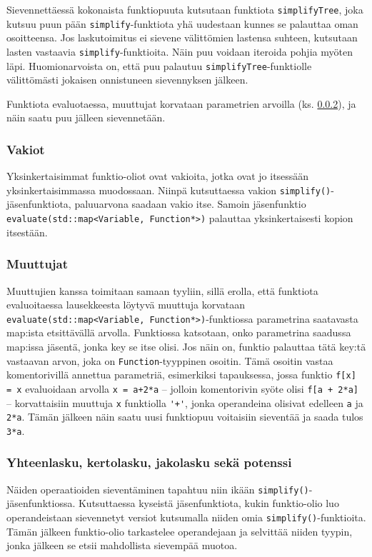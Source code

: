 \documentclass[10pt,a4paper]{article}
\begin{document}
Sievennettäessä kokonaista funktiopuuta kutsutaan funktiota \lstinline!simplifyTree!, joka kutsuu puun pään \lstinline!simplify!-funktiota yhä uudestaan kunnes se palauttaa oman osoitteensa. Jos laskutoimitus ei sievene välittömien lastensa suhteen, kutsutaan lasten vastaavia \lstinline!simplify!-funktioita. Näin puu voidaan iteroida pohjia myöten läpi. Huomionarvoista on, että puu palautuu \lstinline!simplifyTree!-funktiolle välittömästi jokaisen onnistuneen sievennyksen jälkeen.

Funktiota evaluotaessa, muuttujat
korvataan parametrien arvoilla (ks. \ref{sec:muuttujat}), ja näin saatu puu jälleen sievennetään.

\subsubsection{Vakiot}
Yksinkertaisimmat funktio-oliot ovat vakioita, jotka ovat jo itsessään yksinkertaisimmassa muodossaan. Niinpä
kutsuttaessa vakion \lstinline!simplify()!-jäsenfunktiota, paluuarvona saadaan vakio itse.
Samoin jäsenfunktio \lstinline!evaluate(std::map<Variable, Function*>)! palauttaa yksinkertaisesti
kopion itsestään.

\subsubsection{Muuttujat} \label{sec:muuttujat}
Muuttujien kanssa toimitaan samaan tyyliin, sillä erolla, että funktiota evaluoitaessa
lausekkeesta löytyvä muuttuja korvataan \lstinline!evaluate(std::map<Variable, Function*>)!-funktiossa
parametrina saatavasta map:ista etsittävällä arvolla. Funktiossa katsotaan, onko parametrina saadussa map:issa jäsentä, jonka key se itse olisi. Jos näin on, funktio palauttaa tätä key:tä vastaavan arvon, joka on \lstinline!Function!-tyyppinen osoitin. Tämä osoitin vastaa komentorivillä annettua parametriä, esimerkiksi tapauksessa, jossa funktio \lstinline!f[x] = x! evaluoidaan arvolla \lstinline!x = a+2*a! -- jolloin komentorivin syöte olisi \lstinline!f[a + 2*a]! -- korvattaisiin muuttuja \lstinline!x! funktiolla \lstinline!'+'!, jonka operandeina olisivat edelleen \lstinline!a! ja \lstinline!2*a!. Tämän jälkeen näin saatu uusi funktiopuu voitaisiin sieventää ja saada tulos \lstinline!3*a!.

\subsubsection{Yhteenlasku, kertolasku, jakolasku sekä potenssi}
Näiden operaatioiden sieventäminen tapahtuu niin ikään \lstinline!simplify()!-jäsenfunktiossa. 
Kutsuttaessa kyseistä jäsenfunktiota, kukin funktio-olio luo operandeistaan sievennetyt versiot kutsumalla niiden omia \lstinline!simplify()!-funktioita. Tämän jälkeen funktio-olio tarkastelee operandejaan ja selvittää niiden tyypin, jonka jälkeen se etsii mahdollista sievempää muotoa.
\end{document}
